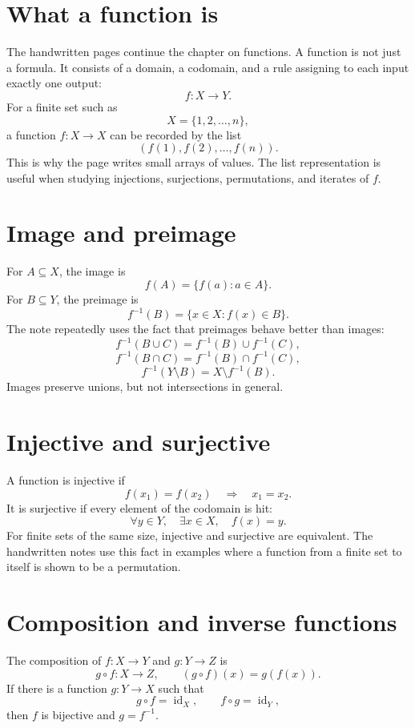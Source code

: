 
\section{What a function is}

The handwritten pages continue the chapter on functions.  A function is not just a formula.  It consists of a domain, a codomain, and a rule assigning to each input exactly one output:
\[
  f:X\to Y.
\]
For a finite set such as
\[
  X=\{1,2,\ldots,n\},
\]
a function $f:X\to X$ can be recorded by the list
\[
  (f(1),f(2),\ldots,f(n)).
\]
This is why the page writes small arrays of values.  The list representation is useful when studying injections, surjections, permutations, and iterates of $f$.

\section{Image and preimage}

For $A\subseteq X$, the image is
\[
  f(A)=\{f(a):a\in A\}.
\]
For $B\subseteq Y$, the preimage is
\[
  f^{-1}(B)=\{x\in X:f(x)\in B\}.
\]
The note repeatedly uses the fact that preimages behave better than images:
\[
  f^{-1}(B\cup C)=f^{-1}(B)\cup f^{-1}(C),
\]
\[
  f^{-1}(B\cap C)=f^{-1}(B)\cap f^{-1}(C),
\]
\[
  f^{-1}(Y\setminus B)=X\setminus f^{-1}(B).
\]
Images preserve unions, but not intersections in general.

\section{Injective and surjective}

A function is injective if
\[
  f(x_1)=f(x_2)\quad\Longrightarrow\quad x_1=x_2.
\]
It is surjective if every element of the codomain is hit:
\[
  \forall y\in Y,\quad \exists x\in X,\quad f(x)=y.
\]
For finite sets of the same size, injective and surjective are equivalent.  The handwritten notes use this fact in examples where a function from a finite set to itself is shown to be a permutation.

\section{Composition and inverse functions}

The composition of $f:X\to Y$ and $g:Y\to Z$ is
\[
  g\circ f:X\to Z,\qquad (g\circ f)(x)=g(f(x)).
\]
If there is a function $g:Y\to X$ such that
\[
  g\circ f=\operatorname{id}_X,\qquad f\circ g=\operatorname{id}_Y,
\]
then $f$ is bijective and $g=f^{-1}$.

